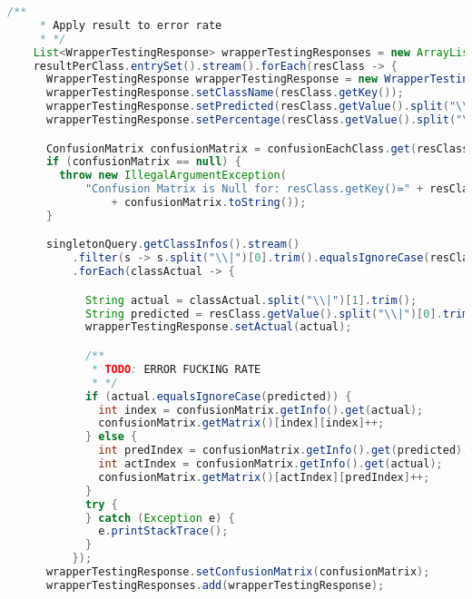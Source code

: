 \begin{lstlisting}[language=Java,basicstyle=\tiny,caption=TestingController.java]
    /**
     * Apply result to error rate
     * */
    List<WrapperTestingResponse> wrapperTestingResponses = new ArrayList<>();
    resultPerClass.entrySet().stream().forEach(resClass -> {
      WrapperTestingResponse wrapperTestingResponse = new WrapperTestingResponse();
      wrapperTestingResponse.setClassName(resClass.getKey());
      wrapperTestingResponse.setPredicted(resClass.getValue().split("\\|")[0]);
      wrapperTestingResponse.setPercentage(resClass.getValue().split("\\|")[1]);

      ConfusionMatrix confusionMatrix = confusionEachClass.get(resClass.getKey());
      if (confusionMatrix == null) {
        throw new IllegalArgumentException(
            "Confusion Matrix is Null for: resClass.getKey()=" + resClass.getKey() + " "
                + confusionMatrix.toString());
      }

      singletonQuery.getClassInfos().stream()
          .filter(s -> s.split("\\|")[0].trim().equalsIgnoreCase(resClass.getKey()))
          .forEach(classActual -> {

            String actual = classActual.split("\\|")[1].trim();
            String predicted = resClass.getValue().split("\\|")[0].trim();
            wrapperTestingResponse.setActual(actual);

            /**
             * TODO: ERROR FUCKING RATE
             * */
            if (actual.equalsIgnoreCase(predicted)) {
              int index = confusionMatrix.getInfo().get(actual);
              confusionMatrix.getMatrix()[index][index]++;
            } else {
              int predIndex = confusionMatrix.getInfo().get(predicted);
              int actIndex = confusionMatrix.getInfo().get(actual);
              confusionMatrix.getMatrix()[actIndex][predIndex]++;
            }
            try {
            } catch (Exception e) {
              e.printStackTrace();
            }
          });
      wrapperTestingResponse.setConfusionMatrix(confusionMatrix);
      wrapperTestingResponses.add(wrapperTestingResponse);


\end{lstlisting}
